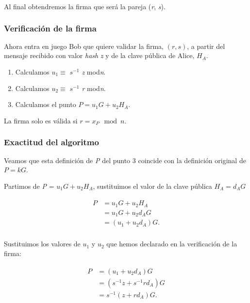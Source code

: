 \documentclass[11pt]{article}
\begin{document}
Al final obtendremos la firma que será la pareja (\textit{r}, \textit{s}).


\subsubsection*{Verificación de la firma}
Ahora entra en juego Bob que quiere validar la firma, $(r,s)$, a partir del mensaje recibido con valor \textit{hash} \textit{z} y de la clave pública de Alice, $H_A$.

\begin{enumerate}
	\item Calculamos $u_1 \equiv$ \textit{$s^{-1}$ z} mod\textit{n}.
	\item Calculamos $u_2 \equiv$ \textit{$s^{-1}$ r} mod\textit{n}.
	\item Calculamos el punto $P = u_1G + u_2 H_A$.	
\end{enumerate}

La firma solo es válida si $r = x_P \mod n$.

\subsubsection*{Exactitud del algoritmo}
Veamos que esta definición de \textit{P} del punto 3 coincide con la definición original de $P = kG $.

Partimos de \textit{P} = $u_1 G + u_2 H_A$, sustituimos el valor de la clave pública $H_A = d_A G$


\begin{align}
\begin{split}
\textit{P} &= u_1 G + u_2 H_A\\ &= u_1 G + u_2 d_A G\\
&=  (u_1 + u_2 d_A) G.\\
\end{split}
\end{align}

Sustituimos los valores de $u_1$ y $u_2$ que hemos declarado en la verificación de la firma:

\begin{align}
\begin{split}
P &= (u_1 + u_2 d_A) G\\
&= (s^{-1}z + s^{-1} r d_A) G  \\
&= s^{-1}(z + r d_A) G.\\
\end{split}
\end{align}
\end{document}
